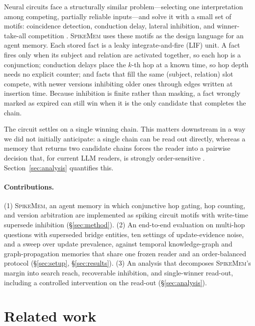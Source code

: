 \documentclass[11pt]{article}
\newcommand{\sm}{\textsc{SpikeMem}}
\begin{document}
Neural circuits face a structurally similar problem---selecting one interpretation among competing,
partially reliable inputs---and solve it with a small set of motifs: coincidence detection,
conduction delay, lateral inhibition, and winner-take-all competition
\citep{shastri1993shruti,maass2000wta}. \sm{} uses these motifs as the design language for an agent
memory. Each stored fact is a leaky integrate-and-fire (LIF) unit. A fact fires only when its subject
and relation are activated together, so each hop is a conjunction; conduction delays place the $k$-th
hop at a known time, so hop depth needs no explicit counter; and facts that fill the same
(subject, relation) slot compete, with newer versions inhibiting older ones through edges written at
insertion time. Because inhibition is finite rather than masking, a fact wrongly marked as expired
can still win when it is the only candidate that completes the chain.

The circuit settles on a single winning chain. This matters downstream in a way we did not initially
anticipate: a single chain can be read out directly, whereas a memory that returns two candidate
chains forces the reader into a pairwise decision that, for current LLM readers, is strongly
order-sensitive \citep{wang2024fair,zheng2023judge}. Section~\ref{sec:analysis} quantifies this.

\paragraph{Contributions.}
(1) \sm{}, an agent memory in which conjunctive hop gating, hop counting, and version arbitration are
implemented as spiking circuit motifs with write-time supersede inhibition (\S\ref{sec:method}).
(2) An end-to-end evaluation on multi-hop questions with superseded bridge entities, ten settings of
update-evidence noise, and a sweep over update prevalence, against temporal knowledge-graph and
graph-propagation memories that share one frozen reader and an order-balanced protocol
(\S\ref{sec:setup}, \S\ref{sec:results}). (3) An analysis that decomposes \sm{}'s margin into search
reach, recoverable inhibition, and single-winner read-out, including a controlled intervention on the
read-out (\S\ref{sec:analysis}).

\section{Related work}
\end{document}
